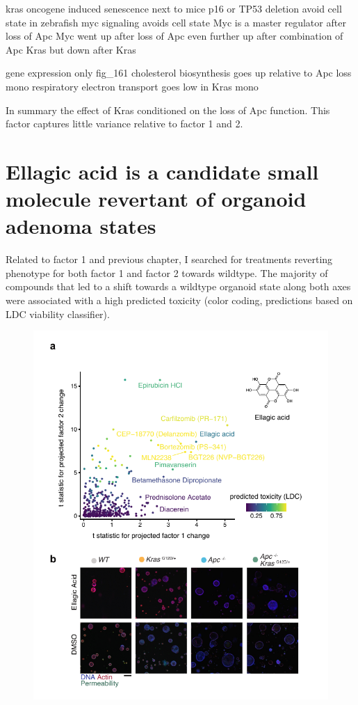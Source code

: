 \begin{flushleft}
kras oncogene induced senescence
next to mice p16 or TP53 deletion avoid cell state
in zebrafish myc signaling avoids cell state
Myc is a master regulator after loss of Apc 
Myc went up after loss of Apc 
even further up after combination of Apc Kras 
but down after Kras

gene expression only
fig_161
cholesterol biosynthesis goes up relative to Apc loss mono
respiratory electron transport goes low in Kras mono

In summary
the effect of Kras conditioned on the loss of Apc function. This factor captures little variance relative to factor 1 and 2.

\newpage
\section{Ellagic acid is a candidate small molecule revertant of organoid adenoma states}

Related to factor 1 and previous chapter, I searched for treatments reverting phenotype for both factor 1 and factor 2 towards wildtype. The majority of compounds that led to a shift towards a wildtype organoid state along both axes were associated with a high predicted toxicity (color coding, predictions based on LDC viability classifier). 


\begin{figure}[h]
\centering
\includegraphics[scale=0.75,
                keepaspectratio]{figures/adenomaprofiling/pdf/fig_5_1.pdf}
\caption{}
\label{fig_180}
\end{figure}
\bigbreak

\end{flushleft}